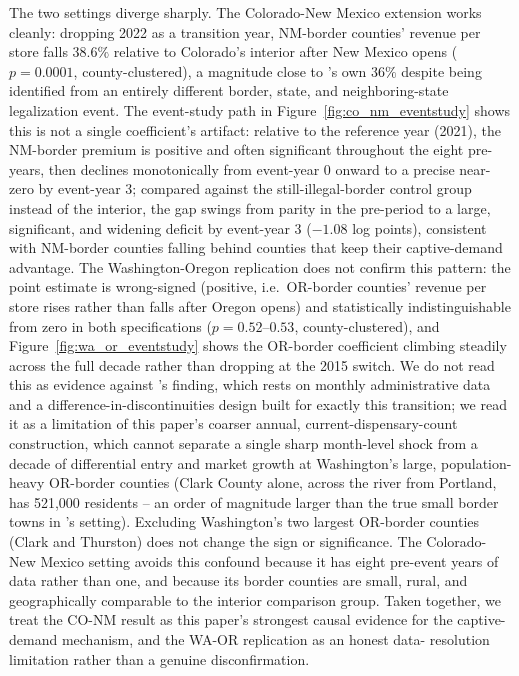 ﻿\documentclass{article}
\begin{document}
The two settings diverge sharply. The Colorado-New Mexico extension works cleanly: dropping 2022 as a
transition year, NM-border counties' revenue per store falls $38.6\%$ relative to Colorado's interior after
New Mexico opens ($p=0.0001$, county-clustered), a magnitude close to \citeauthor{HansenMillerWeber2020}'s
own $36\%$ despite being identified from an entirely different border, state, and neighboring-state
legalization event. The event-study path in Figure~\ref{fig:co_nm_eventstudy} shows this is not a single
coefficient's artifact: relative to the reference year (2021), the NM-border premium is positive and
often significant throughout the eight pre-years, then declines monotonically from event-year 0 onward to a
precise near-zero by event-year 3; compared against the still-illegal-border control group instead of the
interior, the gap swings from parity in the pre-period to a large, significant, and widening deficit by
event-year 3 ($-1.08$ log points), consistent with NM-border counties falling behind counties that keep
their captive-demand advantage. The Washington-Oregon replication does not confirm this pattern: the point
estimate is wrong-signed (positive, i.e.\ OR-border counties' revenue per store rises rather than falls
after Oregon opens) and statistically indistinguishable from zero in both specifications
($p=0.52$--$0.53$, county-clustered), and Figure~\ref{fig:wa_or_eventstudy} shows the OR-border coefficient
climbing steadily across the full decade rather than dropping at the 2015 switch. We do not read this as
evidence against \citeauthor{HansenMillerWeber2020}'s finding, which rests on monthly administrative data
and a difference-in-discontinuities design built for exactly this transition; we read it as a limitation of
this paper's coarser annual, current-dispensary-count construction, which cannot separate a single sharp
month-level shock from a decade of differential entry and market growth at Washington's large,
population-heavy OR-border counties (Clark County alone, across the river from Portland, has 521,000
residents -- an order of magnitude larger than the true small border towns in \citeauthor{HansenMillerWeber2020}'s
setting). Excluding Washington's two largest OR-border counties (Clark and Thurston) does not change the
sign or significance. The Colorado-New Mexico setting avoids this confound because it has eight pre-event
years of data rather than one, and because its border counties are small, rural, and geographically
comparable to the interior comparison group. Taken together, we treat the CO-NM result as this paper's
strongest causal evidence for the captive-demand mechanism, and the WA-OR replication as an honest data-
resolution limitation rather than a genuine disconfirmation.
\end{document}
